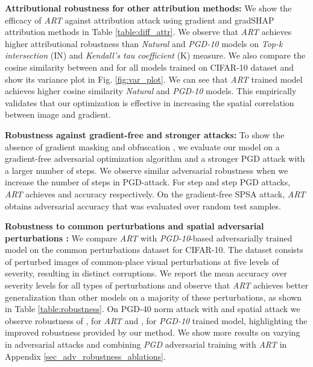 \documentclass[runningheads]{llncs}
\begin{document}
\noindent\textbf{Attributional robustness for other attribution methods:} \label{attr_other} We show the efficacy of \textit{ART} against attribution attack \cite{aaai_sal} using gradient\cite{attr2013gradient} and gradSHAP\cite{gradshap} attribution methods in Table \ref{table:diff_attr}. We observe that \textit{ART} achieves higher attributional robustness than \textit{Natural} and \textit{PGD-10} models on \textit{Top-k intersection} (IN) and \textit{Kendall's tau coefficient} (K) measure. We also compare the cosine similarity between  and  for all models trained on CIFAR-10 dataset and show its variance plot in Fig. \ref{fig:var_plot}. We can see that \textit{ART} trained model achieves higher cosine similarity \textit{Natural} and \textit{PGD-10} models. This empirically validates that our optimization is effective in increasing the spatial correlation between image and gradient. 

\noindent\textbf{Robustness against gradient-free and stronger attacks:}
To show the absence of gradient masking and obfuscation \cite{obfuscate,carlini2019evaluating}, we evaluate our model on a gradient-free adversarial optimization algorithm \cite{spsa_blackbox} and a stronger PGD attack with a larger number of steps. We observe similar adversarial robustness when we increase the number of steps in PGD-attack. For  step and  step PGD attacks, \textit{ART} achieves   and   accuracy respectively. On the gradient-free SPSA \cite{spsa_blackbox} attack, \textit{ART} obtains  adversarial accuracy that was evaluated over  random test samples. 


\noindent\textbf{Robustness to common perturbations \cite{hendrycks2019robustness} and spatial adversarial perturbations \cite{spatialrobustness}:} We compare \textit{ART} with \textit{PGD-10}-based adversarially trained model on the common perturbations dataset \cite{hendrycks2019robustness} for CIFAR-10. The dataset consists of perturbed images of  common-place visual perturbations at five levels of severity, resulting in  distinct corruptions. We report the mean accuracy over severity levels for all  types of perturbations and observe that \textit{ART} achieves better generalization than other models on a majority of these perturbations, as shown in Table \ref{table:robustness}. On PGD-40  norm attack with  and spatial attack \cite{spatialrobustness} we observe robustness of ,  for \textit{ART} and ,  for \textit{PGD-10} trained model, highlighting the improved robustness provided by our method. We show more results on varying  in adversarial attacks and combining \textit{PGD} adversarial training \cite{madrypgd} with \textit{ART} in Appendix \ref{sec_adv_robustness_ablations}.
\end{document}
